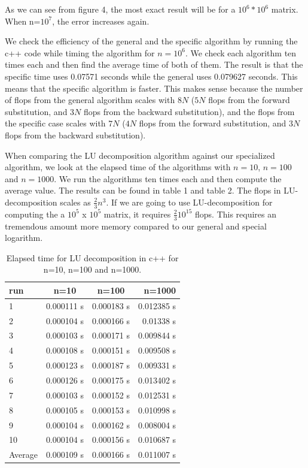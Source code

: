 \documentclass[%
oneside,                 %
final,                   %
10pt]{article}
\begin{document}
As we can see from figure 4, the most exact result will be for a $10^6*10^6$ matrix. When n=$10^7$, the error increases again.


We check the efficiency of the general and the specific algorithm by running the c++ code while timing the algorithm for $n=10^6$. We check each algorithm ten times each and then find the average time of both of them. The result is that the specific time uses 0.07571 seconds while the general uses 0.079627 seconds. This means that the specific algorithm is faster.
This makes sense because the number of flops from the general algorithm scales with $8N$ ($5N$ flops from the forward substitution, and $3N$ flops from the backward substitution), and the flops from the specific case scales with $7N$ ($4N$ flops from the forward substitution, and $3N$ flops from the backward substitution).

When comparing the LU decomposition algorithm against our specialized algorithm, we look at the elapsed time of the algorithms with $n=10$, $n=100$ and $n=1000$. We run the algorithms ten times each and then compute the average value. The results can be found in table 1 and table 2.
The flops in LU-decomposition scales as $\frac{2}{3} n^3$. If we are going to use LU-decomposition for computing the a $10^5$ x $10^5$ matrix, it requires $\frac{2}{3}10^{15}$ flops. This requires an tremendous amount more memory compared to our general and special logarithm.

\begin{table}[H]
    \centering
    \begin{tabular}{|l|c|c|r|}
    \hline
     run & n=10 & n=100 & n=1000\\
     \hline
      1  & 0.000111 s & 0.000183 s & 0.012385 s\\
      2  & 0.000104 s & 0.000166 s & 0.01338 s\\
      3  & 0.000103 s & 0.000171 s & 0.009844 s\\
      4  & 0.000108 s & 0.000151 s & 0.009508 s\\
      5  & 0.000123 s & 0.000187 s & 0.009331 s\\
      6  & 0.000126 s & 0.000175 s & 0.013402 s\\
      7  & 0.000103 s & 0.000152 s & 0.012531 s\\
      8  & 0.000105 s & 0.000153 s & 0.010998 s\\
      9  & 0.000104 s & 0.000162 s & 0.008004 s\\
      10 & 0.000104 s & 0.000156 s & 0.010687 s\\
      \hline
      Average & 0.000109 s & 0.000166 s & 0.011007 s\\
      \hline
    \end{tabular}
    \caption{Elapsed time for LU decomposition in c++ for n=10, n=100 and n=1000.}
    \label{tab:my_label}
\end{table}
\end{document}

